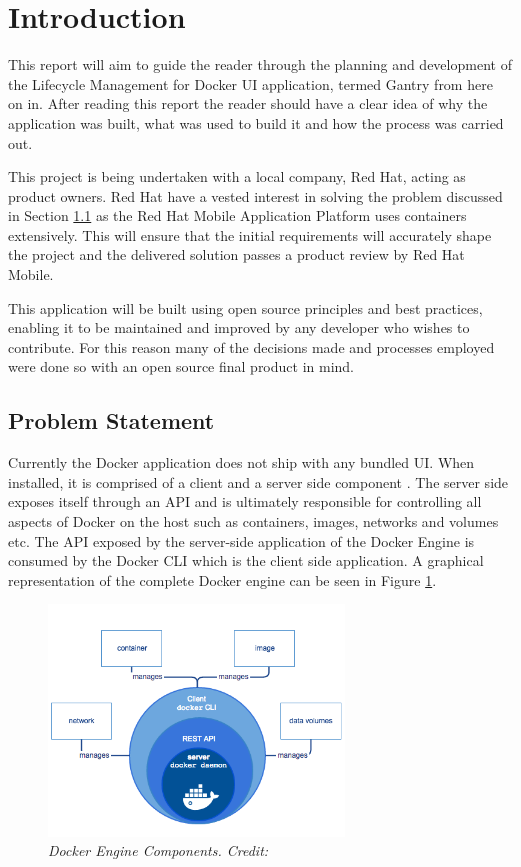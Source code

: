 \section{Introduction}
\label{sec:intro}
This report will aim to guide the reader through the planning and development of the Lifecycle Management for Docker \gls{UI} application, termed Gantry from here on in. After reading this report the reader should have a clear idea of why the application was built, what was used to build it and how the process was carried out.

This project is being undertaken with a local company, Red Hat, acting as product owners. Red Hat have a vested interest in solving the problem discussed in Section \ref{sub:problem} as the Red Hat Mobile Application Platform uses containers extensively. This will ensure that the initial requirements will accurately shape the project and the delivered solution passes a product review by Red Hat Mobile.

This application will be built using open source principles and best practices, enabling it to be maintained and improved by any developer who wishes to contribute. For this reason many of the decisions made and processes employed were done so with an open source final product in mind.

\subsection{Problem Statement}
\label{sub:problem}
Currently the \gls{Docker} application does not ship with any bundled \gls{UI}. When installed, it is comprised of a client and a server side component \citep{Docker2017}. The server side exposes itself through an \gls{API} and is ultimately responsible for controlling all aspects of Docker on the host such as containers, images, networks and volumes etc. The API exposed by the server-side application of the Docker Engine is consumed by the Docker \gls{CLI} which is the client side application. A graphical representation of the complete Docker engine can be seen in Figure \ref{fig:docker_engine}.

\begin{figure}[!ht]
\centering
\includegraphics*[width=0.7\textwidth]{images/docker_engine}
\caption{\em Docker Engine Components. Credit: \citep{Docker2017}}
\label{fig:docker_engine}
\end{figure}

